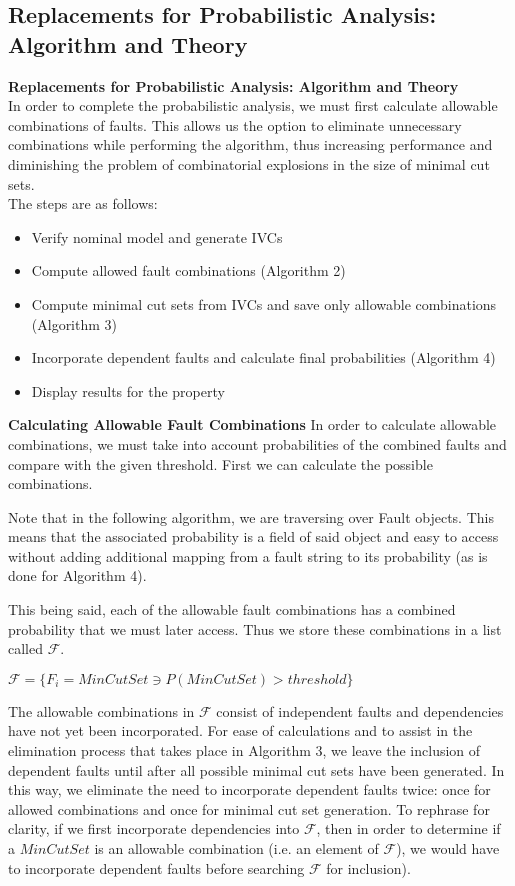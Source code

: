 \subsection{Replacements for Probabilistic Analysis: Algorithm and Theory}

\textbf{Replacements for Probabilistic Analysis: Algorithm and Theory}\\

In order to complete the probabilistic analysis, we must first calculate allowable combinations of faults. This allows us the option to eliminate unnecessary combinations while performing the algorithm, thus increasing performance and diminishing the problem of combinatorial explosions in the size of minimal cut sets. \\

The steps are as follows:\\
\begin{itemize}
\item Verify nominal model and generate IVCs
\item Compute allowed fault combinations (Algorithm 2)
\item Compute minimal cut sets from IVCs and save only allowable combinations (Algorithm 3)
\item Incorporate dependent faults and calculate final probabilities (Algorithm 4)
\item Display results for the property
\end{itemize}

\textbf{Calculating Allowable Fault Combinations}
In order to calculate allowable combinations, we must take into account probabilities of the combined faults and compare with the given threshold. First we can calculate the possible combinations.

Note that in the following algorithm, we are traversing over Fault objects. This means that the associated probability is a field of said object and easy to access without adding additional mapping from a fault string to its probability (as is done for Algorithm 4). 

This being said, each of the allowable fault combinations has a combined probability that we must later access. Thus we store these combinations in a list called $\mathcal{F}$.

$\mathcal{F} = \{F_i = MinCutSet \ni P(MinCutSet) > threshold\}$

The allowable combinations in $\mathcal{F}$ consist of independent faults and dependencies have not yet been incorporated. For ease of calculations and to assist in the elimination process  that takes place in Algorithm 3, we leave the inclusion of dependent faults until after all possible minimal cut sets have been generated. In this way, we eliminate the need to incorporate dependent faults twice: once for allowed combinations and once for minimal cut set generation. To rephrase for clarity, if we first incorporate dependencies into $\mathcal{F}$, then in order to determine if a $MinCutSet$ is an allowable combination (i.e. an element of $\mathcal{F}$), we would have to incorporate dependent faults before searching $\mathcal{F}$ for inclusion). \\


